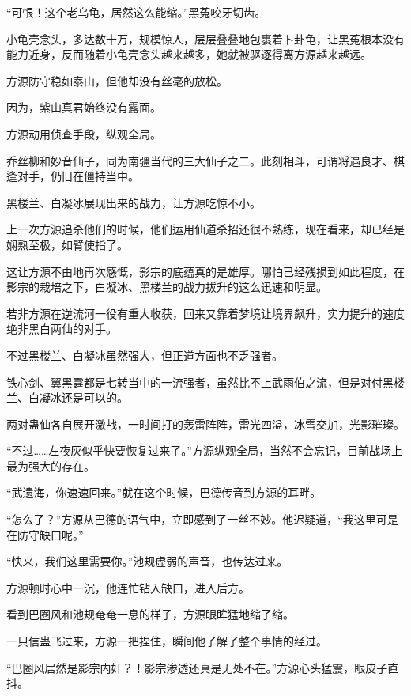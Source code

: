 
\begin{this_body}

“可恨！这个老乌龟，居然这么能缩。”黑菟咬牙切齿。

小龟壳念头，多达数十万，规模惊人，层层叠叠地包裹着卜卦龟，让黑菟根本没有能力近身，反而随着小龟壳念头越来越多，她就被驱逐得离方源越来越远。

方源防守稳如泰山，但他却没有丝毫的放松。

因为，紫山真君始终没有露面。

方源动用侦查手段，纵观全局。

乔丝柳和妙音仙子，同为南疆当代的三大仙子之二。此刻相斗，可谓将遇良才、棋逢对手，仍旧在僵持当中。

黑楼兰、白凝冰展现出来的战力，让方源吃惊不小。

上一次方源追杀他们的时候，他们运用仙道杀招还很不熟练，现在看来，却已经是娴熟至极，如臂使指了。

这让方源不由地再次感慨，影宗的底蕴真的是雄厚。哪怕已经残损到如此程度，在影宗的栽培之下，白凝冰、黑楼兰的战力拔升的这么迅速和明显。

若非方源在逆流河一役有重大收获，回来又靠着梦境让境界飙升，实力提升的速度绝非黑白两仙的对手。

不过黑楼兰、白凝冰虽然强大，但正道方面也不乏强者。

铁心剑、翼黑霆都是七转当中的一流强者，虽然比不上武雨伯之流，但是对付黑楼兰、白凝冰还是可以的。

两对蛊仙各自展开激战，一时间打的轰雷阵阵，雷光四溢，冰雪交加，光影璀璨。

“不过……左夜灰似乎快要恢复过来了。”方源纵观全局，当然不会忘记，目前战场上最为强大的存在。

“武遗海，你速速回来。”就在这个时候，巴德传音到方源的耳畔。

“怎么了？”方源从巴德的语气中，立即感到了一丝不妙。他迟疑道，“我这里可是在防守缺口呢。”

“快来，我们这里需要你。”池规虚弱的声音，也传达过来。

方源顿时心中一沉，他连忙钻入缺口，进入后方。

看到巴圈风和池规奄奄一息的样子，方源眼眸猛地缩了缩。

一只信蛊飞过来，方源一把捏住，瞬间他了解了整个事情的经过。

“巴圈风居然是影宗内奸？！影宗渗透还真是无处不在。”方源心头猛震，眼皮子直抖。


\end{this_body}
